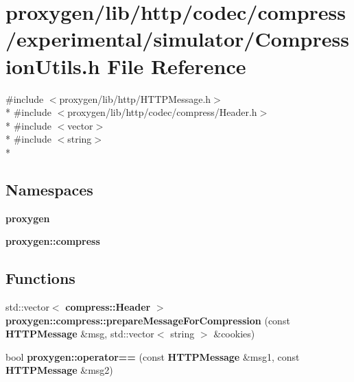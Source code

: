 \section{proxygen/lib/http/codec/compress/experimental/simulator/\+Compression\+Utils.h File Reference}
\label{CompressionUtils_8h}
{\ttfamily \#include $<$proxygen/lib/http/\+H\+T\+T\+P\+Message.\+h$>$}\\*
{\ttfamily \#include $<$proxygen/lib/http/codec/compress/\+Header.\+h$>$}\\*
{\ttfamily \#include $<$vector$>$}\\*
{\ttfamily \#include $<$string$>$}\\*
\subsection*{Namespaces}
\begin{DoxyCompactItemize}
\item 
 {\bf proxygen}
\item 
 {\bf proxygen\+::compress}
\end{DoxyCompactItemize}
\subsection*{Functions}
\begin{DoxyCompactItemize}
\item 
std\+::vector$<$ {\bf compress\+::\+Header} $>$ {\bf proxygen\+::compress\+::prepare\+Message\+For\+Compression} (const {\bf H\+T\+T\+P\+Message} \&msg, std\+::vector$<$ string $>$ \&cookies)
\item 
bool {\bf proxygen\+::operator==} (const {\bf H\+T\+T\+P\+Message} \&msg1, const {\bf H\+T\+T\+P\+Message} \&msg2)
\end{DoxyCompactItemize}
